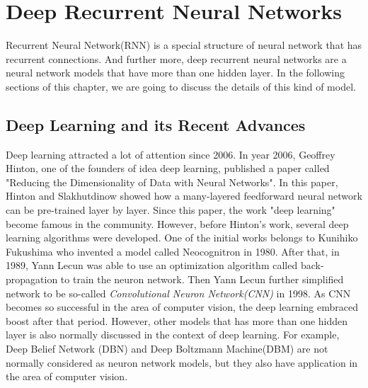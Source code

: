 \documentclass[officiallayout]{tktla}
\begin{document}
\chapter{Deep Recurrent Neural Networks}
Recurrent Neural Network(RNN) is a special structure of neural network that has recurrent connections. And further more, deep recurrent neural networks are a neural network models that have more than one hidden layer.  In the following sections of this chapter, we are going to discuss the details of this kind of model. 
\section{Deep Learning and its Recent Advances}
Deep learning attracted a lot of attention since 2006. In year 2006, Geoffrey Hinton, one of the founders of idea deep learning, published a paper called "Reducing the Dimensionality of
Data with Neural Networks"\cite{hinton2006reducing}. In this paper, Hinton and Slakhutdinow showed how a many-layered feedforward neural network can be pre-trained layer by layer. Since this paper, the work "deep learning" become famous in the community. However, before Hinton's work, several deep learning algorithms were developed. One of the initial works belongs to Kunihiko Fukushima who invented a model called Neocognitron in 1980. After that, in 1989, Yann Lecun was able to use an optimization algorithm called back-propagation to train the neuron network. Then Yann Lecun further simplified network to be so-called \textit{Convolutional Neuron Network(CNN)} in 1998. As CNN becomes so successful in the area of computer vision, the deep learning embraced boost after that period. However, other models that has more than one hidden layer is also normally discussed in the context of deep learning. For example, Deep Belief Network (DBN) and Deep Boltzmann Machine(DBM) are not normally considered as neuron network models, but they also have application in the area of computer vision.
\end{document}
